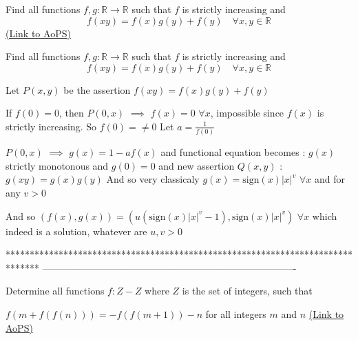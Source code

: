 \begin{problem}
	Find all functions $f,g:\mathbb{R}\to\mathbb{R}$ such that $f$ is strictly increasing and \[f(xy)=f(x)g(y)+f(y)\quad \forall x,y\in \mathbb{R}\]
	\flushright \href{https://artofproblemsolving.com/community/q1h578361}{(Link to AoPS)}
\end{problem}



\begin{solution}
	\begin{tcolorbox}Find all functions $f,g:\mathbb{R}\to\mathbb{R}$ such that $f$ is strictly increasing and \[f(xy)=f(x)g(y)+f(y)\quad \forall x,y\in \mathbb{R}\]\end{tcolorbox}
Let $P(x,y)$ be the assertion $f(xy)=f(x)g(y)+f(y)$

If $f(0)=0$, then $P(0,x)$ $\implies$ $f(x)=0$ $\forall x$, impossible since $f(x)$ is strictly increasing. So $f(0)=\ne 0$
Let $a=\frac 1{f(0)}$

$P(0,x)$ $\implies$ $g(x)=1-af(x)$ and functional equation becomes :
$g(x)$ strictly monotonous and $g(0)=0$ and new assertion $Q(x,y)$ : $g(xy)=g(x)g(y)$
And so very classicaly $g(x)=\text{sign}(x)|x|^v$ $\forall x$ and for any $v>0$

And so $\boxed{(f(x),g(x))=\left(u(\text{sign}(x)|x|^v-1),\text{sign}(x)|x|^v\right)}$ $\forall x$ which indeed is a solution, whatever are $u,v>0$
\end{solution}
*******************************************************************************
-------------------------------------------------------------------------------

\begin{problem}
	Determine all functions $f:Z - Z$ where $Z$ is the set of integers, such that 

$f(m+f(f(n)))=-f(f(m+1))-n$ for all integers $m$ and $n$
	\flushright \href{https://artofproblemsolving.com/community/q1h580160}{(Link to AoPS)}
\end{problem}



